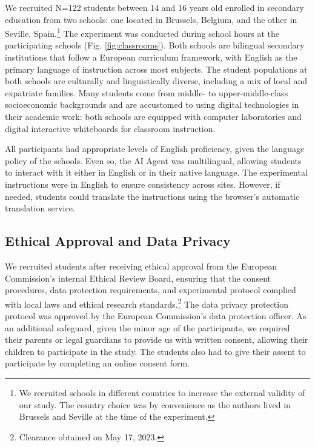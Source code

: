 \documentclass[
  11pt,
]{article}
\begin{document}
We recruited N=122 students between 14 and 16 years old enrolled in secondary education from two schools: one located in Brussels, Belgium, and the other in Seville, Spain.\footnote{We recruited schools in different countries to increase the external validity of our study. The country choice was by convenience as the authors lived in Brussels and Seville at the time of the experiment.} The experiment was conducted during school hours at the participating schools (Fig. \ref{fig:classrooms}). Both schools are bilingual secondary institutions that follow a European curriculum framework, with English as the primary language of instruction across most subjects. The student populations at both schools are culturally and linguistically diverse, including a mix of local and expatriate families. Many students come from middle- to upper-middle-class socioeconomic backgrounds and are accustomed to using digital technologies in their academic work: both schools are equipped with computer laboratories and digital interactive whiteboards for classroom instruction.

All participants had appropriate levels of English proficiency, given the language policy of the schools. Even so, the AI Agent was multilingual, allowing students to interact with it either in English or in their native language. The experimental instructions were in English to ensure consistency across sites. However, if needed, students could translate the instructions using the browser's automatic translation service.

\subsection{Ethical Approval and Data Privacy}\label{ethical-approval-and-data-privacy}

We recruited students after receiving ethical approval from the European Commission's internal Ethical Review Board, ensuring that the consent procedures, data protection requirements, and experimental protocol complied with local laws and ethical research standards.\footnote{Clearance obtained on May 17, 2023.} The data privacy protection protocol was approved by the European Commission's data protection officer. As an additional safeguard, given the minor age of the participants, we required their parents or legal guardians to provide us with written consent, allowing their children to participate in the study. The students also had to give their assent to participate by completing an online consent form.
\end{document}

